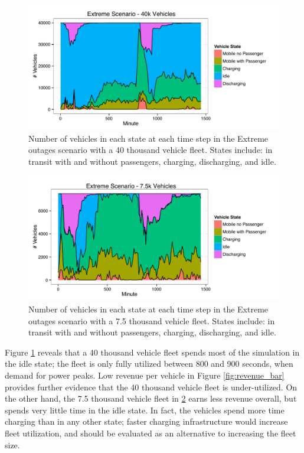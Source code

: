\documentclass[journal]{IEEEtran}
\begin{document}
\begin{figure}[!htbp]
  \includegraphics[width=\linewidth]{plots/states-area-40k.pdf}
  \caption{Number of vehicles in each state at each time step in the Extreme outages scenario with a 40 thousand vehicle fleet. States include: in transit with and without passengers, charging, discharging, and idle.}
  \label{fig:time_extreme_40k}
\end{figure}

\begin{figure}[!htbp]
  \includegraphics[width=\linewidth]{plots/states-area-7500.pdf}
  \caption{Number of vehicles in each state at each time step in the Extreme outages scenario with a 7.5 thousand vehicle fleet. States include: in transit with and without passengers, charging, discharging, and idle.}
  \label{fig:time_extreme_7500}
\end{figure}

Figure \ref{fig:time_extreme_40k} reveals that a 40 thousand vehicle fleet spends most of the simulation in the idle state; the fleet is only fully utilized between 800 and 900 seconds, when demand for power peaks. Low revenue per vehicle in Figure \ref{fig:revenue_bar} provides further evidence that the 40 thousand vehicle fleet is under-utilized. On the other hand, the 7.5 thousand vehicle fleet in \ref{fig:time_extreme_7500} earns less revenue overall, but spends very little time in the idle state. In fact, the vehicles spend more time charging than in any other state; faster charging infrastructure would increase fleet utilization, and should be evaluated as an alternative to increasing the fleet size.
\end{document}
